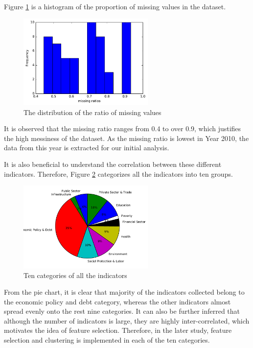 \documentclass[a4paper]{article}
\begin{document}
Figure \ref{fig:m1}  is a histogram of the proportion of missing values in the dataset.
\begin{figure}
\centering
\includegraphics[width=0.6\textwidth]{missingRatio.pdf}
\caption{\label{fig:m1}The distribution of the ratio of missing values}
\end{figure}

It is observed that the missing ratio ranges from 0.4 to over 0.9, which justifies the high messiness of the dataset. As the missing ratio is lowest in Year 2010, the data from this year is extracted for our initial analysis.

It is also beneficial to understand  the correlation between these different indicators. Therefore,  Figure \ref{fig:c1} categorizes all the indicators into ten groups. 
\begin{figure}
\centering
\includegraphics[width=0.6\textwidth]{category.pdf}
\caption{\label{fig:c1}Ten categories of all the indicators}
\end{figure}

From the pie chart, it is clear that majority of the indicators collected  belong to the economic policy and debt category, whereas the other indicators almost spread evenly onto the rest nine categories. It can also be further inferred that although the number of indicators is large, they are highly inter-correlated, which motivates the idea of feature selection. Therefore, in the later study, feature selection and clustering is implemented in each of the ten categories.
\end{document}
